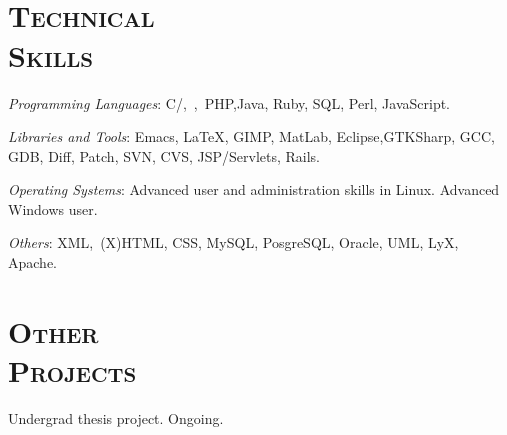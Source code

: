 \begin{resume}
 \begin{formatb}
   \\
   \body\\
 \end{formatb}



\section{\textsc{Technical\\ Skills}}

\emph{Programming Languages}: C/\Cplusplus,\ \CSharp,\ PHP,Java, Ruby, SQL, Perl, JavaScript.

\emph{Libraries and Tools}: Emacs, \LaTeX, GIMP, MatLab, Eclipse,GTKSharp, GCC, GDB, Diff, Patch, SVN, CVS, JSP/Servlets, Rails.

\emph{Operating Systems}: Advanced user and administration skills in Linux.  Advanced Windows user.

\emph{Others}: XML,\ (X)HTML, CSS, MySQL, PosgreSQL, Oracle, UML, LyX, Apache.


\section{\textsc{Other\\  Projects}}

\begin{position}
Undergrad thesis project. Ongoing.
\end{position}


\end{resume}
